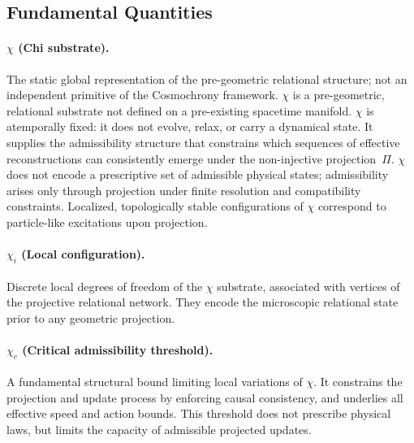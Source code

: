 \subsection{Fundamental Quantities}
  \label{subsec:fundamental-quantities}

  \paragraph{\texorpdfstring{$\chi$}{χ} (Chi substrate).}
    The static global representation of the pre-geometric relational structure;
    not an independent primitive of the Cosmochrony framework.
    $\chi$ is a pre-geometric, relational substrate not defined on a pre-existing
    spacetime manifold.
    $\chi$ is atemporally fixed: it does not evolve, relax, or carry a dynamical
    state.
    It supplies the admissibility structure that constrains which sequences of
    effective reconstructions can consistently emerge under the non-injective
    projection~$\Pi$.
    $\chi$ does not encode a prescriptive set of admissible physical states;
    admissibility arises only through projection under finite resolution and
    compatibility constraints.
    Localized, topologically stable configurations of $\chi$ correspond to
    particle-like excitations upon projection.

  \paragraph{\texorpdfstring{$\chi_i$}{χᵢ} (Local configuration).}
    Discrete local degrees of freedom of the $\chi$ substrate, associated with
    vertices of the projective relational network.
    They encode the microscopic relational state prior to any geometric projection.

  \paragraph*{$\chi_c$ (Critical admissibility threshold).}
    A fundamental structural bound limiting local variations of $\chi$.
    It constrains the projection and update process by enforcing causal consistency,
    and underlies all effective speed and action bounds.
    This threshold does not prescribe physical laws, but limits the capacity of
    admissible projected updates.

